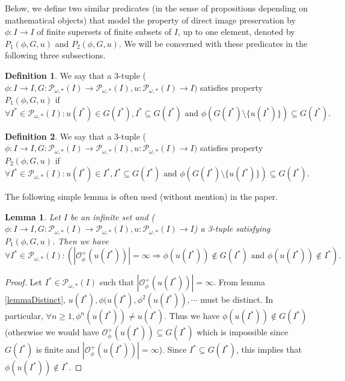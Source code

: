 \documentclass[a4paper,11pt]{article}
\theoremstyle{plain}
\newtheorem{lemma}{Lemma}[section]
\theoremstyle{definition}
\newtheorem{definition}{Definition}[section]
\theoremstyle{remark}
\begin{document}
Below, we define two similar predicates (in the sense of propositions depending on mathematical objects) that model the property of direct image preservation by $\phi : I \to I$ of finite supersets of finite subsets of $I$, up to one element, denoted by $P_1(\phi,G,u)$ and $P_2(\phi,G,u)$. We will be concerned with these predicates in the following three subsections.

\begin{definition}
We say that a 3-tuple ($\phi : I \to I, G : \mathcal{P}_{\omega,*}(I) \to \mathcal{P}_{\omega,*}(I), u : \mathcal{P}_{\omega,*}(I) \to I)$ satisfies property $P_1(\phi,G,u)$ if 
\[ \forall I^* \in \mathcal{P}_{\omega,*}(I) : u(I^*) \in G(I^*), I^* \subseteq G(I^*) \text{ and } \phi(G(I^*) \setminus \{u(I^*)\}) \subseteq G(I^*). \]
\end{definition}

\begin{definition}
We say that a 3-tuple ($\phi : I \to I, G : \mathcal{P}_{\omega,*}(I) \to \mathcal{P}_{\omega,*}(I), u : \mathcal{P}_{\omega,*}(I) \to I)$ satisfies property $P_2(\phi,G,u)$ if 
\[ \forall I^* \in \mathcal{P}_{\omega,*}(I) : u(I^*) \in I^*, I^* \subseteq G(I^*) \text{ and } \phi(G(I^*) \setminus \{u(I^*)\}) \subseteq G(I^*). \]
\end{definition}

The following simple lemma is often used (without mention) in the paper.

\begin{lemma}
\label{lemmaRelationsPhiUG}
Let $I$ be an infinite set and ($\phi : I \to I,G : \mathcal{P}_{\omega,*}(I) \to \mathcal{P}_{\omega,*}(I),u : \mathcal{P}_{\omega,*}(I) \to I$) a 3-tuple satisfying $P_1(\phi,G,u)$. Then we have 
\[ \forall I^* \in \mathcal{P}_{\omega,*}(I) : \left( |\mathcal{O}^{+}_\phi(u(I^*))| = \infty \Rightarrow \phi(u(I^*)) \notin G(I^*) \text{ and } \phi(u(I^*)) \notin I^* \right) . \]
\end{lemma}

\begin{proof}
Let $I^* \in \mathcal{P}_{\omega,*}(I)$ such that $|\mathcal{O}^{+}_\phi(u(I^*))| = \infty$. From lemma \ref{lemmaDistinct}, $u(I^*),\phi(u(I^*),\phi^2(u(I^*)),\cdots$ must be distinct. In particular, $\forall n \geq 1, \phi^n(u(I^*)) \neq u(I^*)$. Thus we have $\phi(u(I^*)) \notin G(I^*)$ (otherwise we would have $\mathcal{O}^{+}_\phi(u(I^*)) \subseteq G(I^*)$ which is impossible since $G(I^*)$ is finite and $|\mathcal{O}^{+}_\phi(u(I^*))| = \infty$). Since $I^* \subseteq G(I^*)$, this implies that $\phi(u(I^*)) \notin I^*$.
\end{proof}
\end{document}
